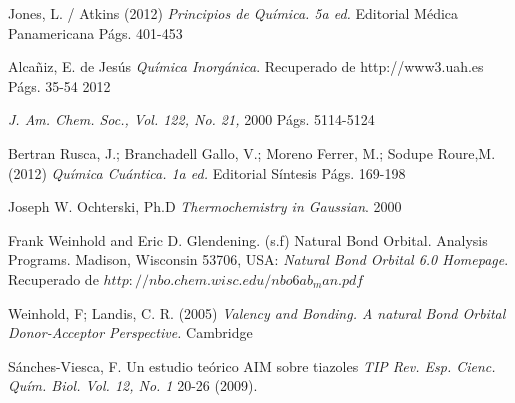 \begin{thebibliography}{9}

Jones, L. / Atkins (2012)
\textit{Principios de Química. 5a ed.} Editorial Médica Panamericana
Págs. 401-453

Alcañiz, E. de Jesús
\textit{Química Inorgánica}. 
Recuperado de http://www3.uah.es Págs. 35-54
2012

\textit{J. Am. Chem. Soc., Vol. 122, No. 21, }
2000 Págs. 5114-5124

Bertran Rusca, J.; Branchadell Gallo, V.; Moreno Ferrer, M.; Sodupe Roure,M. (2012)
\textit{Química Cuántica. 1a ed.} Editorial Síntesis
Págs. 169-198

Joseph W. Ochterski, Ph.D
\textit{Thermochemistry in Gaussian}.
2000

Frank Weinhold and Eric D. Glendening. (s.f) Natural Bond Orbital. Analysis Programs. Madison, Wisconsin 53706, USA: 
\textit {Natural Bond Orbital 6.0 Homepage}. Recuperado de $http://nbo.chem.wisc.edu/nbo6ab_man.pdf$

Weinhold, F; Landis, C. R. (2005) 
\textit{Valency and Bonding. A natural Bond Orbital Donor-Acceptor Perspective.}
Cambridge

Sánches-Viesca, F. Un estudio teórico AIM sobre tiazoles \textit{TIP Rev. Esp. Cienc. Quím. Biol. Vol. 12, No. 1} 20-26 (2009).
\end{thebibliography}
